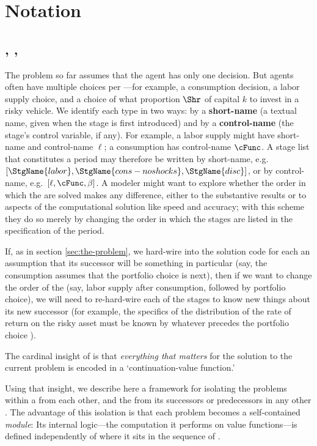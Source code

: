 \documentclass[titlepage, headings=optiontotocandhead]{econark}
\begin{document}
\hypertarget{notation}{}
\section{Notation}\label{sec:notation}

\hypertarget{intervals-stages-perches}{}
\subsection{\Intervals, \Stgs, \Prchs}

The problem so far assumes that the agent has only one decision.  But agents often have multiple choices per {\interval}---for example, a consumption decision, a labor supply choice, and a choice of what proportion $\Shr$ of capital $k$ to invest in a risky vehicle.  We identify each {\stg} type in two ways: by a \textbf{short-name} (a textual name, given when the stage is first introduced) and by a \textbf{control-name} (the stage's control variable, if any).  For example, a labor supply {\stg} might have short-name  and control-name $\ell$; a consumption {\stg} has control-name $\cFunc$.  A stage list that constitutes a period may therefore be written by short-name, e.g.\ $[\StgName{labor}, \StgName{cons-noshocks}, \StgName{disc}]$, or by control-name, e.g.\ $[\ell, \cFunc, \beta]$. A modeler might want to explore whether the order in which the {\stgs} are solved makes any difference, either to the substantive results or to aspects of the computational solution like speed and accuracy; with this scheme they do so merely by changing the order in which the stages are listed in the specification of the period.

If, as in section \ref{sec:the-problem}, we hard-wire into the solution code for each {\stg} an assumption that its successor {\stg} will be something in particular (say, the consumption {\stg} assumes that the portfolio choice is next), then if we want to change the order of the {\stgs} (say, labor supply after consumption, followed by portfolio choice), we will need to re-hard-wire each of the stages to know new things about its new successor (for example, the specifics of the distribution of the rate of return on the risky asset must be known by whatever {\stg} precedes the portfolio choice {\stg}).

The cardinal insight of \citet{bellman1957} is that \emph{everything that matters} for the solution to the current problem is encoded in a `continuation-value function.'

Using that insight, we describe here a framework for isolating the {\stg} problems within a {\interval} from each other, and the {\interval} from its successors or predecessors in any other {\interval}.  The advantage of this isolation is that each {\stg} problem becomes a self-contained \textit{module}: Its internal logic---the computation it performs on value functions---is defined independently of where it sits in the sequence of {\stgs}.
\end{document}
